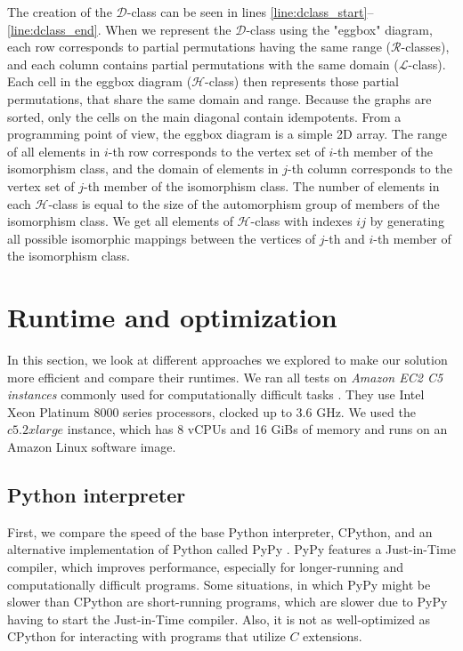 The creation of the $\mathcal{D}$-class can be seen in lines \ref{line:dclass_start}--\ref{line:dclass_end}. When we represent the $\mathcal{D}$-class using the "eggbox" diagram, each row corresponds to partial permutations having the same range ($\mathcal{R}$-classes), and each column contains partial permutations with the same domain ($\mathcal{L}$-class). Each cell in the eggbox diagram ($\mathcal{H}$-class) then represents those partial permutations, that share the same domain and range. Because the graphs are sorted, only the cells on the main diagonal contain idempotents. From a programming point of view, the eggbox diagram is a simple 2D array. The range of all elements in $i$-th row corresponds to the vertex set of $i$-th member of the isomorphism class, and the domain of elements in $j$-th column corresponds to the vertex set of $j$-th member of the isomorphism class. The number of elements in each $\mathcal{H}$-class is equal to the size of the automorphism group of members of the isomorphism class. We get all elements of $\mathcal{H}$-class with indexes $ij$ by generating all possible isomorphic mappings between the vertices of $j$-th and $i$-th member of the isomorphism class.

\section{Runtime and optimization}
\label{sec:optimization}

In this section, we look at different approaches we explored to make our solution more efficient and compare their runtimes. We ran all tests on \emph{Amazon EC2 C5 instances} commonly used for computationally difficult tasks \cite{ec2c5}. They use Intel Xeon Platinum 8000 series processors, clocked up to 3.6 GHz. We used the $c5.2xlarge$ instance, which has 8 vCPUs and 16 GiBs of memory and runs on an Amazon Linux software image.

\subsection{Python interpreter}

First, we compare the speed of the base Python interpreter, CPython, and an alternative implementation of Python called PyPy \cite{pypy}. PyPy features a Just-in-Time compiler, which improves performance, especially for longer-running and computationally difficult programs. Some situations, in which PyPy might be slower than CPython are short-running programs, which are slower due to PyPy having to start the Just-in-Time compiler. Also, it is not as well-optimized as CPython for interacting with programs that utilize $C$ extensions.

